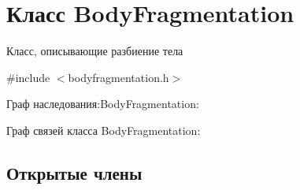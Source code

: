 \hypertarget{class_body_fragmentation}{}\section{Класс Body\+Fragmentation}
\label{class_body_fragmentation}


Класс, описывающие разбиение тела  




{\ttfamily \#include $<$bodyfragmentation.\+h$>$}



Граф наследования\+:Body\+Fragmentation\+:


Граф связей класса Body\+Fragmentation\+:
\subsection*{Открытые члены}
